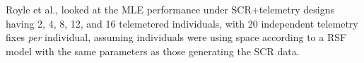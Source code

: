 Royle et al., looked at the MLE performance under SCR+telemetry
designs having 
 2, 4, 8, 12, and 16 telemetered individuals, with 20 
independent telemetry fixes {\it per} individual, assuming
individuals were using space according to a RSF model with the same
parameters as those generating the SCR data. 



